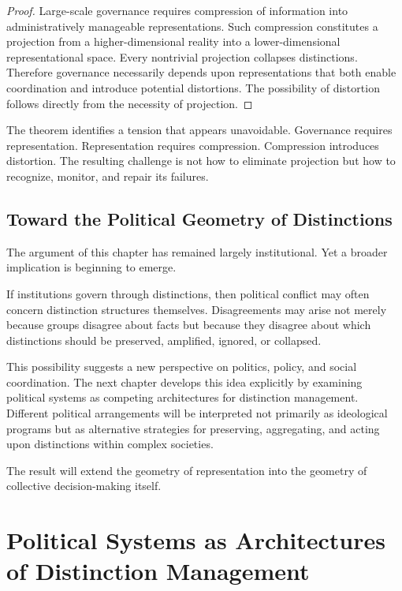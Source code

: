 \documentclass[11pt,oneside,openany]{book}
\begin{document}
\begin{proof}

Large-scale governance requires compression of information into administratively manageable representations. Such compression constitutes a projection from a higher-dimensional reality into a lower-dimensional representational space. Every nontrivial projection collapses distinctions. Therefore governance necessarily depends upon representations that both enable coordination and introduce potential distortions. The possibility of distortion follows directly from the necessity of projection.

\end{proof}

The theorem identifies a tension that appears unavoidable. Governance requires representation. Representation requires compression. Compression introduces distortion. The resulting challenge is not how to eliminate projection but how to recognize, monitor, and repair its failures.

\section{Toward the Political Geometry of Distinctions}

The argument of this chapter has remained largely institutional. Yet a broader implication is beginning to emerge.

If institutions govern through distinctions, then political conflict may often concern distinction structures themselves. Disagreements may arise not merely because groups disagree about facts but because they disagree about which distinctions should be preserved, amplified, ignored, or collapsed.

This possibility suggests a new perspective on politics, policy, and social coordination. The next chapter develops this idea explicitly by examining political systems as competing architectures for distinction management. Different political arrangements will be interpreted not primarily as ideological programs but as alternative strategies for preserving, aggregating, and acting upon distinctions within complex societies.

The result will extend the geometry of representation into the geometry of collective decision-making itself.

\chapter{Political Systems as Architectures of Distinction Management}
\end{document}

